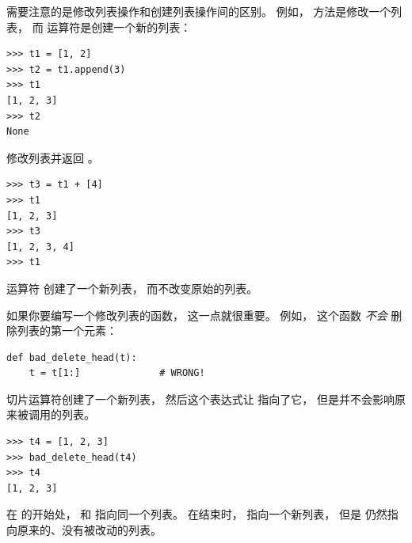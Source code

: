 需要注意的是修改列表操作和创建列表操作间的区别。
例如，  方法是修改一个列表， 而 \li{+} 运算符是创建一个新的列表：

  
  

%
\begin{lstlisting}
>>> t1 = [1, 2]
>>> t2 = t1.append(3)
>>> t1
[1, 2, 3]
>>> t2
None
\end{lstlisting}

%

 修改列表并返回 。

%
\begin{lstlisting}
>>> t3 = t1 + [4]
>>> t1
[1, 2, 3]
>>> t3
[1, 2, 3, 4]
>>> t1
\end{lstlisting}

%

运算符 \li{+} 创建了一个新列表， 而不改变原始的列表。


如果你要编写一个修改列表的函数， 这一点就很重要。
例如， 这个函数 {\em 不会} 删除列表的第一个元素：

%
\begin{lstlisting}
def bad_delete_head(t):
    t = t[1:]              # WRONG!
\end{lstlisting}

%

切片运算符创建了一个新列表， 然后这个表达式让  指向了它，
但是并不会影响原来被调用的列表。

  

%
\begin{lstlisting}
>>> t4 = [1, 2, 3]
>>> bad_delete_head(t4)
>>> t4
[1, 2, 3]
\end{lstlisting}

%

在  的开始处，  和  指向同一个列表。  在结束时，  指向一个新列表， 但是  仍然指向原来的、没有被改动的列表。

